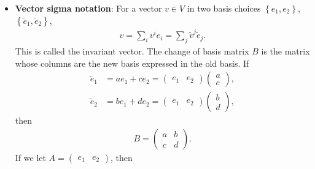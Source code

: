 \documentclass{report}
\begin{document}
\begin{itemize}
            Here \(x,y\) are the coordinates, and \(xe_1+ye_2\) is the vector they represent.
            \bigbreak \noindent 
            To specify the space and its basis together, write "\(v\in V\), where \(V\) has ordered basis \(\mathcal B\)." If you also want to show how the basis describes the space, write 
            \begin{align*}
                V=\operatorname{span}\{e_1,e_2\}
            .\end{align*}
            If \(\mathcal C=(\tilde e_1,\tilde e_2)\) is another basis of \(V\), you can write \(\mathcal B\to\mathcal C\) for the change of basis. To show the direction of the coordinate conversion, use
            \[
                [v]_{\mathcal C}=P_{\mathcal C\leftarrow\mathcal B}[v]_{\mathcal B}.
            \]
        \item \textbf{Vector sigma notation}: For a vector $v \in V$ in two basis choices $\left\{e_{1}, e_{2}\right\} $, $\left\{\tilde{e}_{1}, \tilde{e}_{2}\right\} $,
            \begin{align*}
                v = \sum_{i}v^{i}e_{i} = \sum_{j}\tilde{v}^{j}\tilde{e}_{j}
            .\end{align*}
            This is called the invariant vector. The change of basis matrix $B$ is the matrix whose columns are the new basis expressed in the old basis. If 
            \begin{align*}
                \tilde{e}_{1} &= ae_{1} + ce_{2} = \begin{pmatrix} e_{1} & e_{2} \end{pmatrix} \begin{pmatrix} a \\ c \end{pmatrix}, \\
                \tilde{e}_{2} &= be_{1} + de_{2} = \begin{pmatrix} e_{1} & e_{2} \end{pmatrix} \begin{pmatrix} b \\ d \end{pmatrix}
            ,\end{align*}
            then
            \begin{align*}
                B = \begin{pmatrix} a & b \\ c & d \end{pmatrix}
            .\end{align*}
            If we let $A = \begin{pmatrix} e_{1} & e_{2} \end{pmatrix} $, then

\end{itemize}
\end{document}
